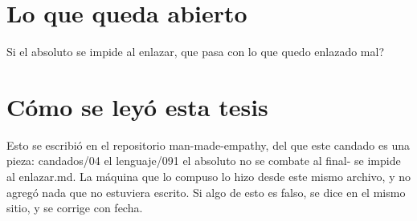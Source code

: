 \documentclass[11pt,a4paper]{article}
\begin{document}
\section{Lo que queda abierto}
\textquestiondown{}Si el absoluto se impide al enlazar, que pasa con lo que quedo enlazado mal?

\section*{Cómo se leyó esta tesis}
Esto se escribió en el repositorio man-made-empathy, del que este candado es una pieza: candados/04 el lenguaje/091 el absoluto no se combate al final- se impide al enlazar.md. La máquina que lo compuso lo hizo desde este mismo archivo, y no agregó nada que no estuviera escrito. Si algo de esto es falso, se dice en el mismo sitio, y se corrige con fecha.
\end{document}
